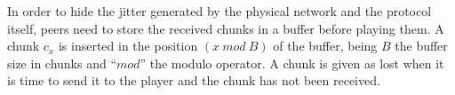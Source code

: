 In order to hide the jitter generated by the physical network and the
protocol itself, peers need to store the received chunks in a buffer
before playing them. A chunk $c_x$ is inserted in the position
$(x~\mathit{mod}~B)$ of the buffer, being $B$ the buffer size in
chunks and ``$\mathit{mod}$'' the modulo operator. A chunk is given as
lost when it is time to send it to the player and the chunk has not
been received.
